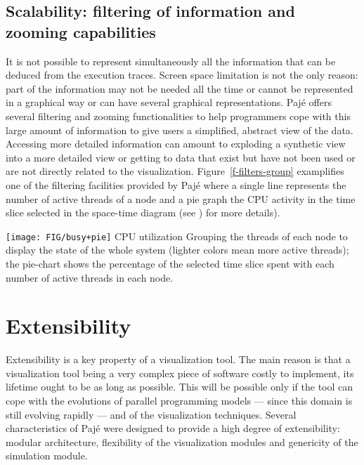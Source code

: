 \subsection{Scalability: filtering of information and zooming capabilities}
\label{s-filtering}

It is not possible to represent simultaneously all the information
that can be deduced from the execution traces.  Screen space
limitation is not the only reason: part of the information may not be
needed all the time or cannot be represented in a graphical way or can
have several graphical representations.  Pajé offers several filtering
and zooming functionalities to help programmers cope with this large
amount of information to give users a simplified, abstract view of the
data. Accessing more detailed information can amount to exploding a
synthetic view into a more detailed view or getting to data that exist
but have not been used or are not directly related to the
visualization. Figure~\ref{f-filters-group} examplifies one of the
filtering facilities provided by Pajé where a single line represents
the number of active threads of a node and a pie graph the CPU
activity in the time slice selected in the space-time diagram (see
\cite{ChassinS00,ChassinS:2000a,Stein:1999}) for more details).

           {\texttt{[image: FIG/busy+pie]}} {CPU utilization} {Grouping
           the threads of each node to display the state of the whole
           system (lighter colors mean more active threads); the
           pie-chart shows the percentage of the selected time slice
           spent with each number of active threads in each node.}

\section{Extensibility}
\label{sec:extensibility}

Extensibility is a key property of a visualization tool. The
main reason is that a visualization tool being a very complex 
piece of software costly to implement, its lifetime ought to
be as long as possible. This will be possible only if the tool
can cope with the evolutions of parallel programming models ---
since this domain is still evolving rapidly --- and of the
visualization techniques. Several characteristics of Pajé were
designed to provide a high degree of extensibility: modular
architecture, flexibility of the visualization modules and genericity
of the simulation module.


